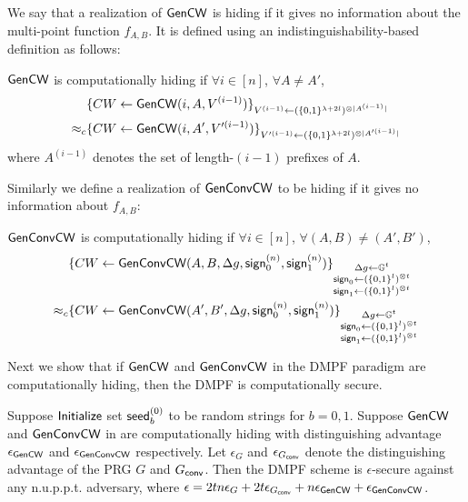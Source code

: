 We say that a realization of ${\sf Gen}{\sf CW}$ is hiding if it gives no information about the multi-point function $f_{A,B}$. It is defined using an indistinguishability-based definition as follows: 
\begin{definition}\label{def:GenCW_hiding}
    ${\sf Gen}{\sf CW}$ is computationally hiding if $\forall i\in[n]$, $\forall A\not=A'$,
    \[
        \begin{split}
            &\{CW\gets {\sf Gen}{\sf CW}(i,A,V^{(i-1)})\}_{V^{(i-1)}\gets(\{0,1\}^{\lambda+2l})^{\otimes |A^{(i-1)}|}}\\\approx_c&\{CW\gets {\sf Gen}{\sf CW}(i,A',V'^{(i-1)})\}_{V'^{(i-1)}\gets(\{0,1\}^{\lambda+2l})^{\otimes |A'^{(i-1)}|}}
        \end{split}
    \]
    where $A^{(i-1)}$ denotes the set of length-$(i-1)$ prefixes of $A$. 
\end{definition}
Similarly we define a realization of ${\sf Gen}{\sf Conv}{\sf CW}$ to be hiding if it gives no information about $f_{A,B}$: 
\begin{definition}\label{def:GenConvCW_hiding}
    $\,$\\${\sf Gen}{\sf Conv}{\sf CW}$ is computationally hiding if $\forall i\in[n]$, $\forall (A,B)\not=(A',B')$, 
    \[
        \begin{split}
            &\{CW\gets {\sf Gen}{\sf Conv}{\sf CW}(A,B,\Delta g, {\sf sign}_0^{(n)}, {\sf sign}_1^{(n)})\}_{\substack{
                \Delta g\gets \mathbb{G}^t\\{\sf sign}_0\gets (\{0,1\}^l)^{\otimes t}\\{\sf sign}_1\gets (\{0,1\}^l)^{\otimes t}}}\\\approx_c&\{CW\gets {\sf Gen}{\sf Conv}{\sf CW}(A',B',\Delta g, {\sf sign}_0^{(n)}, {\sf sign}_1^{(n)})\}_{\substack{
                    \Delta g\gets \mathbb{G}^t\\{\sf sign}_0\gets (\{0,1\}^l)^{\otimes t}\\{\sf sign}_1\gets (\{0,1\}^l)^{\otimes t}}}
        \end{split}
    \]
\end{definition}
Next we show that if ${\sf Gen}{\sf CW}$ and ${\sf Gen}{\sf Conv}{\sf CW}$ in the DMPF paradigm  are computationally hiding, then the DMPF is computationally secure. 
\begin{lemma}\label{lem:paradigm_secure}
    Suppose ${\sf Initialize}$ set ${\sf seed}_b^{(0)}$ to be random strings for $b=0,1$. Suppose  ${\sf Gen}{\sf CW}$ and ${\sf Gen}{\sf Conv}{\sf CW}$ in  are computationally hiding with distinguishing advantage $\epsilon_{{\sf Gen}{\sf CW}}$ and $\epsilon_{{\sf Gen}{\sf Conv}{\sf CW}}$ respectively. Let $\epsilon_G$ and $\epsilon_{G_{\sf conv}}$ denote the distinguishing advantage of the PRG $G$ and $G_{\sf conv}$. Then the DMPF scheme is $\epsilon$-secure against any n.u.p.p.t. adversary, where $\epsilon = 2tn\epsilon_{G}+2t \epsilon_{G_{\sf conv}}+n\epsilon_{{\sf Gen}{\sf CW}} +\epsilon_{{\sf Gen}{\sf Conv}{\sf CW}}$. 
\end{lemma}
